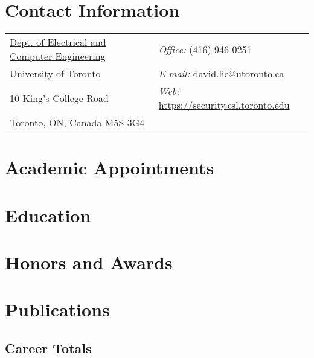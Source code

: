 \documentclass[letter,10pt]{article}
\begin{document}
\thispagestyle{firststyle}


\section{Contact Information}
%
%
%
\newlength{\rcollength}\setlength{\rcollength}{3in}%
%
\begin{tabular}[t]{@{}p{\textwidth-\rcollength}p{\rcollength}}
	\href{http://www.ece.toronto.edu/}%
	{Dept. of Electrical and Computer Engineering} & \textit{Office:} (416) 946-0251 \\
	\href{http://www.toronto.edu/}{University of Toronto}
	&  \textit{E-mail:}
	\href{mailto:david.lie@utoronto.ca}{david.lie@utoronto.ca} \\
	10 King's College Road           & 	\textit{Web:} \href{https://security.csl.toronto.edu}{\url{https://security.csl.toronto.edu}}\\
	Toronto, ON, Canada M5S 3G4    & \\
\end{tabular}

\section{Academic Appointments}


\section{Education}


\section{Honors and Awards}


\section{Publications} 
\subsection{Career Totals}


\end{document}
